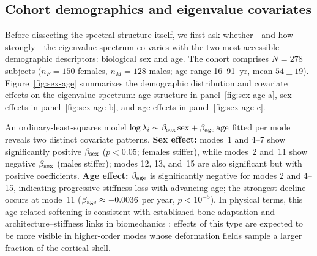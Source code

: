 \documentclass[11pt]{article}
\begin{document}
\subsection{Cohort demographics and eigenvalue covariates}

Before dissecting the spectral structure itself, we first ask whether---and how strongly---the eigenvalue spectrum co-varies with the two most accessible demographic descriptors: biological sex and age.
The cohort comprises $N{=}278$ subjects ($n_F{=}150$ females, $n_M{=}128$ males; age range 16--91~yr, mean $54{\pm}19$).
Figure~\ref{fig:sex-age} summarizes the demographic distribution and covariate effects on the eigenvalue spectrum: age structure in panel~\ref{fig:sex-age-a}, sex effects in panel~\ref{fig:sex-age-b}, and age effects in panel~\ref{fig:sex-age-c}.

An ordinary-least-squares model $\log\lambda_i \sim \beta_{\rm sex}\,\mathrm{sex} + \beta_{\rm age}\,\mathrm{age}$ fitted per mode reveals two distinct covariate patterns.
\textbf{Sex effect:} modes~1 and 4--7 show significantly positive $\beta_{\rm sex}$ ($p<0.05$; females stiffer), while modes~2 and~11 show negative $\beta_{\rm sex}$ (males stiffer); modes 12, 13, and~15 are also significant but with positive coefficients.
\textbf{Age effect:} $\beta_{\rm age}$ is significantly negative for modes 2 and 4--15, indicating progressive stiffness loss with advancing age; the strongest decline occurs at mode~11 ($\beta_{\rm age} \approx -0.0036$ per year, $p < 10^{-5}$).
In physical terms, this age-related softening is consistent with established bone adaptation and architecture--stiffness links in biomechanics \citep{Frost1987,Huiskes1987,FarrKhosla2015,Zebaze2010Porosity}; effects of this type are expected to be more visible in higher-order modes whose deformation fields sample a larger fraction of the cortical shell.
\end{document}
